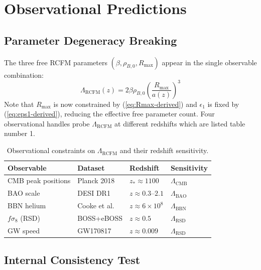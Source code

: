 \documentclass[10pt,twocolumn]{article}
\theoremstyle{definition}
\newcommand{\Rmax}{R_{\max}}
\DeclareRobustCommand{\onecoltable}[2][]{%
  \begin{table}[#1]%
    \centering
    #2
  \end{table}%
}
\begin{document}
\section{Observational Predictions}
\label{sec:obs}

\subsection{Parameter Degeneracy Breaking}

The three free RCFM parameters
\( (\beta,\rho_{B,0},\Rmax) \) appear in the single
observable combination:
\begin{equation}
  \Lambda_{\mathrm{RCFM}}(z)
    = 2\beta\rho_{B,0}\left(\frac{\Rmax}{a(z)}\right)^{3}
\end{equation}
Note that \( \Rmax \) is now constrained by
(\ref{eq:Rmax-derived}) and \( \epsilon_{1} \) is fixed by
(\ref{eq:eps1-derived}), reducing the effective free
parameter count.  
Four observational handles probe
\( \Lambda_{\mathrm{RCFM}} \) at different redshifts which are listed table number 1.

\onecoltable[htb]{%
  \centering
  \caption{Observational constraints on \( \Lambda_{\mathrm{RCFM}} \) and their redshift sensitivity.}
  \label{tab:constraints}
  \begin{tabular}{lllp{3.5cm}}
  \toprule
  Observable & Dataset & Redshift & Sensitivity\\
  \midrule
  CMB peak positions
    & Planck 2018 \citep{PlanckVI2020}
    & \( z_{*}\approx1100 \)
    & \( \Lambda_{\mathrm{CMB}} \)\\
  BAO scale
    & DESI DR1 \citep{DESI2024}
    & \( z\approx0.3 \)--$2.1$
    & \( \Lambda_{\mathrm{BAO}} \)\\
  BBN helium
    & Cooke et al.\ \citep{Cooke2018}
    & \( z\approx6\times10^{8} \)
    & \( \Lambda_{\mathrm{BBN}} \)\\
  \( f\sigma_{8} \) (RSD)
    & BOSS+eBOSS \citep{Alam2021}
    & \( z\approx0.5 \)
    & \( \Lambda_{\mathrm{RSD}} \)\\
  GW speed
    & GW170817 \citep{Abbott2017GW}
    & \( z\approx0.009 \)
    & \( \Lambda_{\mathrm{RSD}} \)\\
  \bottomrule
  \end{tabular}%
}

\subsection{Internal Consistency Test}
\end{document}
